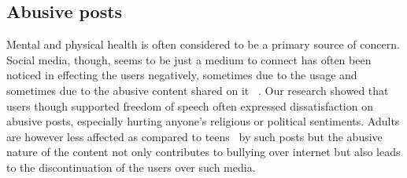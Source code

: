 \subsection{Abusive posts}
Mental and physical health is often considered to be a primary source of concern. Social media, though, seems to be just a medium to connect has often been noticed in effecting the users negatively, sometimes due to the usage and sometimes due to the abusive content shared on it ~\cite{newyorktimes2017}. Our research showed that users though supported freedom of speech often expressed dissatisfaction on abusive posts, especially hurting anyone's religious or political sentiments. Adults are however less affected as compared to teens~\cite{lenhart2011teens,rainie2012tone} by such posts but the abusive nature of the content not only contributes to bullying over internet but also leads to the discontinuation of the users over such media.

